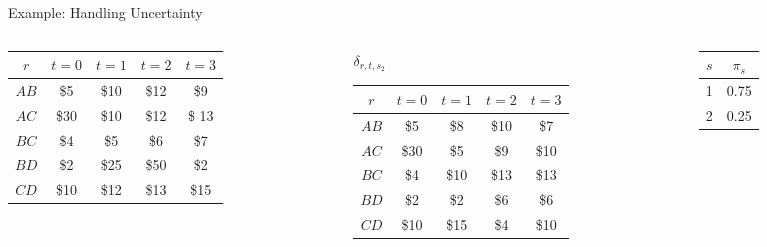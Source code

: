 \documentclass[10pt, aspectratio=169]{beamer}
\begin{document}
\begin{frame}{Example: Handling Uncertainty}
\begin{columns}
\begin{column}{0.4\textwidth}
\begin{center}
                \begin{tabular}{|c||c|c|c|c|}
                    \hline
                    $r$ & $t=0$ & $t=1$ & $t=2$ & $t=3$ \\
                    \hline \hline
                    $AB$ & \$5 & \$10 & \$12 & \$9\\
                    \hline
                    $AC$ & \$30 & \$10 & \$12 & \$ 13\\
                    \hline
                    $BC$ & \$4 & \$5 & \$6 & \$7\\
                    \hline
                    $BD$ & \$2 & \$25 & \$50 & \$2\\
                    \hline
                    $CD$ & \$10 & \$12 & \$13 & \$15\\
                    \hline
                \end{tabular}
            \end{center}
        \end{column}
        \begin{column}{0.4\textwidth}
            \begin{center}
                $\delta_{r,t,s_2}$

                \begin{tabular}{|c||c|c|c|c|}
                    \hline
                    $r$ & $t=0$ & $t=1$ & $t=2$ & $t=3$\\
                    \hline \hline
                    $AB$ & \$5 & \$8 & \$10 & \$7\\
                    \hline
                    $AC$ & \$30 & \$5 & \$9 & \$10\\
                    \hline
                    $BC$ & \$4 & \$10 & \$13 & \$13\\
                    \hline
                    $BD$ & \$2 & \$2 & \$6 & \$6\\
                    \hline
                    $CD$ & \$10 & \$15 & \$4 & \$10\\
                    \hline
                \end{tabular}
            \end{center}
        \end{column}
        \begin{column}{0.2\textwidth}
            \begin{center}
                \begin{tabular}{|c||c|}
                    \hline
                    $s$ & $\pi_s$ \\
                    \hline \hline
                    1 & 0.75 \\
                    \hline
                    2 & 0.25 \\
                    \hline
    

\end{tabular}
\end{center}
\end{column}
\end{columns}
\end{frame}
\end{document}
